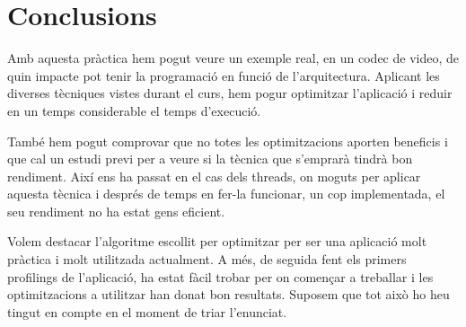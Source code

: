 \chapter{Conclusions}

Amb aquesta pràctica hem pogut veure un exemple real, en un codec de video, de quin impacte pot tenir la programació en funció de l'arquitectura. Aplicant les diverses tècniques vistes durant el curs, hem pogur optimitzar l'aplicació i reduir en un temps considerable el temps d'execució.

També hem pogut comprovar que no totes les optimitzacions aporten beneficis i que cal un estudi previ per a veure si la tècnica que s'emprarà tindrà bon rendiment. Així ens ha passat en el cas dels threads, on moguts per aplicar aquesta tècnica i després de temps en fer-la funcionar, un cop implementada, el seu rendiment no ha estat gens eficient. 

Volem destacar l'algoritme escollit per optimitzar per ser una aplicació molt pràctica i molt utilitzada actualment. A més, de seguida fent els primers profilings de l'aplicació, ha estat fàcil trobar per on començar a treballar i les optimitzacions a utilitzar han donat bon resultats. Suposem que tot això ho heu tingut en compte en el moment de triar l'enunciat.

